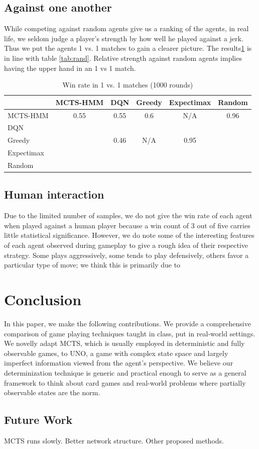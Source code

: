 \documentclass{article}
\begin{document}
\subsection{Against one another}
While competing against random agents give us a ranking of the agents, in real life, we seldom judge a player's strength by how well he played against a jerk. Thus we put the agents 1 vs. 1 matches to gain a clearer picture. The results\ref{tab:mat} is in line with table \ref{tab:rand}. Relative strength against random agents implies having the upper hand in an 1 vs 1 match. 

\begin{table}
    \centering
    \begin{tabular}{l c c c c c}
    \toprule
        & MCTS-HMM & DQN & Greedy & Expectimax & Random \\\hline
        MCTS-HMM & 0.55 & 0.55 & 0.6 & N/A & 0.96 \\
        DQN & & & & & \\ 
        Greedy & & 0.46 & N/A & 0.95 \\ 
        Expectimax & & & & & \\ 
        Random \\
    \bottomrule
    \end{tabular}
    \caption{Win rate in 1 vs. 1 matches (1000 rounds)}
    \label{tab:mat}
\end{table}


\subsection{Human interaction}
Due to the limited number of samples, we do not give the win rate of each agent when played against a human player because a win count of 3 out of five carries little statistical significance. However, we do note some of the interesting features of each agent observed during gameplay to give a rough idea of their respective strategy. \todo{} Some plays aggressively, some tends to play defensively, others favor a particular type of move; we think this is primarily due to \todo{}


\section{Conclusion}
In this paper, we make the following contributions. We provide a comprehensive comparison of game playing techniques taught in class, put in real-world settings. We novelly adapt MCTS, which is usually employed in deterministic and fully observable games, to UNO, a game with complex state space and largely imperfect information viewed from the agent's perspective. We believe our determinization technique is generic and practical enough to serve as a general framework to think about card games and real-world problems where partially observable states are the norm. 

\subsection{Future Work}
MCTS runs slowly. Better network structure. Other proposed methods.


\newpage
\printbibliography
\end{document}

